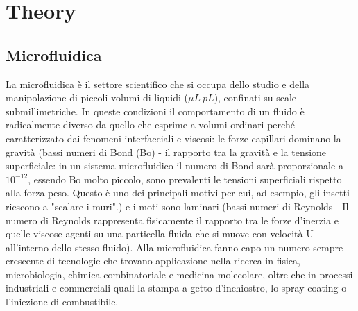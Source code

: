 \documentclass[letterpaper,12pt]{article}
\begin{document}
\section{Theory}
\subsection{Microfluidica}
La microfluidica è il settore scientifico che si occupa dello studio e della manipolazione di piccoli volumi di liquidi ($\mu L \ pL$), confinati su scale submillimetriche. In queste condizioni il comportamento di un fluido è radicalmente diverso da quello che esprime a volumi ordinari perché caratterizzato dai fenomeni interfacciali e viscosi: le forze capillari dominano la gravità (bassi numeri di Bond (Bo) - il rapporto tra la gravità e la tensione superficiale:  in un sistema microfluidico il numero di Bond sarà proporzionale a $10^{-12}$, essendo Bo molto piccolo, sono prevalenti le tensioni superficiali rispetto alla forza peso. Questo è uno dei principali motivi per cui, ad esempio, gli insetti riescono a "scalare i muri".) e i moti sono laminari (bassi numeri di Reynolds - Il numero di Reynolds rappresenta fisicamente il rapporto tra le forze d'inerzia e quelle viscose agenti su una particella fluida che si muove con velocità U all'interno dello stesso fluido). Alla microfluidica fanno capo un numero sempre crescente di tecnologie che trovano applicazione nella ricerca in fisica, microbiologia, chimica combinatoriale e medicina molecolare, oltre che in processi industriali e commerciali quali la stampa a getto d'inchiostro, lo spray coating o l'iniezione di combustibile. 
\end{document}
